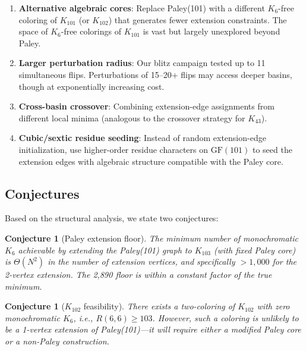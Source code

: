 \documentclass[11pt,a4paper]{article}
\theoremstyle{plain}
\newtheorem{conjecture}[theorem]{Conjecture}
\theoremstyle{remark}
\newcommand{\GF}{\mathrm{GF}}
\begin{document}
\begin{enumerate}[leftmargin=2em]
  \item \textbf{Alternative algebraic cores}: Replace Paley(101)
    with a different $K_6$-free coloring of $K_{101}$ (or $K_{102}$)
    that generates fewer extension constraints. The space of
    $K_6$-free colorings of $K_{101}$ is vast but largely unexplored
    beyond Paley.

  \item \textbf{Larger perturbation radius}: Our blitz campaign
    tested up to 11 simultaneous flips. Perturbations of 15--20+
    flips may access deeper basins, though at exponentially
    increasing cost.

  \item \textbf{Cross-basin crossover}: Combining extension-edge
    assignments from different local minima (analogous to the
    crossover strategy for $K_{43}$).

  \item \textbf{Cubic/sextic residue seeding}: Instead of random
    extension-edge initialization, use higher-order residue
    characters on $\GF(101)$ to seed the extension edges with
    algebraic structure compatible with the Paley core.
\end{enumerate}

\subsection{Conjectures}

Based on the structural analysis, we state two conjectures:

\begin{conjecture}[Paley extension floor]\label{conj:paley-floor}
The minimum number of monochromatic $K_6$ achievable by extending
the Paley(101) graph to $K_{103}$ (with fixed Paley core) is
$\Theta(N^2)$ in the number of extension vertices, and specifically
$> 1{,}000$ for the 2-vertex extension. The 2{,}890 floor is within
a constant factor of the true minimum.
\end{conjecture}

\begin{conjecture}[$K_{102}$ feasibility]\label{conj:k102}
There exists a two-coloring of $K_{102}$ with zero monochromatic
$K_6$, i.e., $R(6,6) \geq 103$. However, such a coloring is
unlikely to be a 1-vertex extension of Paley(101)---it will require
either a modified Paley core or a non-Paley construction.
\end{conjecture}
\end{document}
